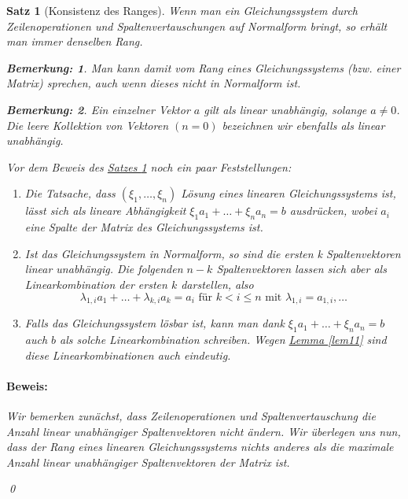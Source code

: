 \documentclass{report}
\newcommand{\lb}{\lambda}
\theoremstyle{customrem}
\newtheorem*{bemerkung}{Bemerkung\textnormal:}
\theoremstyle{customdef}
\newtheorem{satz}[definition]{Satz}
\renewenvironment{proof}{\paragraph{Beweis: }}{\qed}
\theoremstyle{customenv}
\begin{document}
	\begin{satz}[Konsistenz des Ranges]
		\label{satz12}
		Wenn man ein Gleichungssystem durch Zeilenoperationen und Spaltenvertauschungen auf Normalform bringt, so erhält man immer denselben Rang.\\

		\begin{bemerkung}
			Man kann damit vom Rang eines Gleichungssystems (bzw. einer Matrix) sprechen, auch wenn dieses nicht in Normalform ist.
		\end{bemerkung}
		\begin{bemerkung}
			Ein einzelner Vektor \(a\) gilt als linear unabhängig, solange \(a \neq 0\). Die leere Kollektion von Vektoren \((n=0)\) bezeichnen wir ebenfalls als linear unabhängig.\\
		\end{bemerkung}

		 Vor dem Beweis des \hyperref[satz12]{Satzes \ref*{satz12}} noch ein paar Feststellungen:
		\begin{enumerate}
			\item Die Tatsache, dass \((\xi_1, \ldots, \xi_n)\) Lösung eines linearen Gleichungssystems ist, lässt sich als lineare Abhängigkeit
			\(\xi_1a_1 + \ldots + \xi_n a_n = b\) ausdrücken, wobei \(a_i\) eine Spalte der Matrix des Gleichungssystems ist.
			\item Ist das Gleichungssystem in Normalform, so sind die ersten k Spaltenvektoren linear unabhängig. Die folgenden \(n-k\) Spaltenvektoren lassen sich aber als Linearkombination der ersten \(k\) darstellen, also
			\[
			\lb_{1,i}a_1 + \ldots + \lb_{k,i}a_k = a_i \text{ für } k < i \le n
			\text{ mit }  \lb_{1,i} = a_{1,i}, \dots
			\]
			\item Falls das Gleichungssystem lösbar ist, kann man dank \(\xi_1a_1 + \ldots + \xi_n a_n = b\) auch \(b\) als solche Linearkombination schreiben. Wegen \hyperref[lem11]{Lemma \ref*{lem11}} sind diese Linearkombinationen auch eindeutig.
		\end{enumerate}
		\begin{proof}
			Wir bemerken zunächst, dass Zeilenoperationen und Spaltenvertauschung die Anzahl linear unabhängiger Spaltenvektoren nicht ändern.
			Wir überlegen uns nun, dass der Rang eines linearen Gleichungssystems nichts anderes als die maximale Anzahl linear unabhängiger Spaltenvektoren der Matrix ist.\linebreak


\end{proof}
\end{satz}
\end{document}
